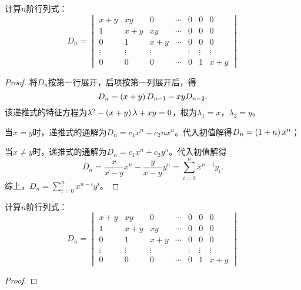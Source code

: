 \begin{problem}
计算\(n\)阶行列式：
\begin{equation*}
    D_n=
    \begin{vmatrix}
        x+y    & xy     & 0      & \cdots & 0      & 0      & 0      \\
        1      & x+y    & xy     & \cdots & 0      & 0      & 0      \\
        0      & 1      & x+y    & \cdots & 0      & 0      & 0      \\
        \vdots & \vdots & \vdots &        & \vdots & \vdots & \vdots \\
        0      & 0      & 0      & \cdots & 0      & 1      & x+y
    \end{vmatrix}
\end{equation*}
\end{problem}
\begin{proof}
    将\(D_n\)按第一行展开，后项按第一列展开后，得
    \begin{equation*}
        D_n=\left( x+y \right)D_{n-1}-xyD_{n-2}.
    \end{equation*}
    该递推式的特征方程为\(\lambda^2-\left( x+y \right)\lambda+xy=0\)，根为\(\lambda_1=x\)，\(\lambda_2=y\)。

    当\(x=y\)时，递推式的通解为\(D_n=c_1x^n+c_2nx^n\)。代入初值解得\(D_n=\left( 1+n \right)x^n\)；

    当\(x\neq y\)时，递推式的通解为\(D_n=c_1x^n+c_2y^n\)。代入初值解得
    \begin{equation*}
        D_n=\frac{x}{x-y}x^n-\frac{y}{x-y}y^n=\sum_{i=0}^{n}x^{n-i}y_i.
    \end{equation*}
    综上，\(D_n=\sum_{i=0}^{n}x^{n-i}y^i\)。
\end{proof}

\begin{problem}
计算\(n\)阶行列式：
\begin{equation*}
    D_n=
    \begin{vmatrix}
        x+y    & xy     & 0      & \cdots & 0      & 0      & 0      \\
        1      & x+y    & xy     & \cdots & 0      & 0      & 0      \\
        0      & 1      & x+y    & \cdots & 0      & 0      & 0      \\
        \vdots & \vdots & \vdots &        & \vdots & \vdots & \vdots \\
        0      & 0      & 0      & \cdots & 0      & 1      & x+y
    \end{vmatrix}
\end{equation*}
\end{problem}
\begin{proof}
\end{proof}

